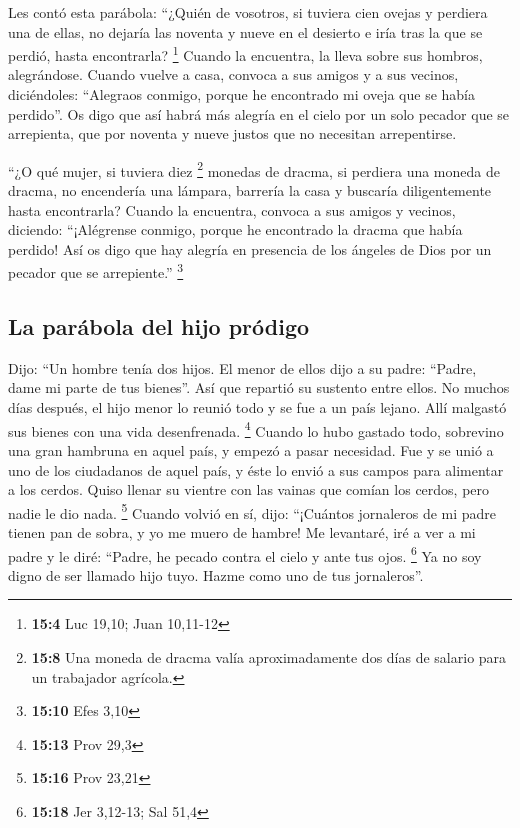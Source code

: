  Les contó esta parábola:  ``¿Quién de
vosotros, si tuviera cien ovejas y perdiera una de ellas, no dejaría las
noventa y nueve en el desierto e iría tras la que se perdió, hasta
encontrarla? \footnote{\textbf{15:4} Luc 19,10; Juan 10,11-12}
 Cuando la encuentra, la lleva sobre sus hombros,
alegrándose.  Cuando vuelve a casa, convoca a sus amigos y
a sus vecinos, diciéndoles: ``Alegraos conmigo, porque he encontrado mi
oveja que se había perdido''.  Os digo que así habrá más
alegría en el cielo por un solo pecador que se arrepienta, que por
noventa y nueve justos que no necesitan arrepentirse.

 ``¿O qué mujer, si tuviera diez \footnote{\textbf{15:8}
  Una moneda de dracma valía aproximadamente dos días de salario para un
  trabajador agrícola.} monedas de dracma, si perdiera una moneda de
dracma, no encendería una lámpara, barrería la casa y buscaría
diligentemente hasta encontrarla?  Cuando la encuentra,
convoca a sus amigos y vecinos, diciendo: ``¡Alégrense conmigo, porque
he encontrado la dracma que había perdido!  Así os digo
que hay alegría en presencia de los ángeles de Dios por un pecador que
se arrepiente.'' \footnote{\textbf{15:10} Efes 3,10}

\hypertarget{la-paruxe1bola-del-hijo-pruxf3digo}{%
\subsection{La parábola del hijo
pródigo}\label{la-paruxe1bola-del-hijo-pruxf3digo}}

 Dijo: ``Un hombre tenía dos hijos.  El
menor de ellos dijo a su padre: ``Padre, dame mi parte de tus bienes''.
Así que repartió su sustento entre ellos.  No muchos días
después, el hijo menor lo reunió todo y se fue a un país lejano. Allí
malgastó sus bienes con una vida desenfrenada. \footnote{\textbf{15:13}
  Prov 29,3}  Cuando lo hubo gastado todo, sobrevino una
gran hambruna en aquel país, y empezó a pasar necesidad. 
Fue y se unió a uno de los ciudadanos de aquel país, y éste lo envió a
sus campos para alimentar a los cerdos.  Quiso llenar su
vientre con las vainas que comían los cerdos, pero nadie le dio nada.
\footnote{\textbf{15:16} Prov 23,21}  Cuando volvió en
sí, dijo: ``¡Cuántos jornaleros de mi padre tienen pan de sobra, y yo me
muero de hambre!  Me levantaré, iré a ver a mi padre y le
diré: ``Padre, he pecado contra el cielo y ante tus ojos. \footnote{\textbf{15:18}
  Jer 3,12-13; Sal 51,4}  Ya no soy digno de ser llamado
hijo tuyo. Hazme como uno de tus jornaleros''.

